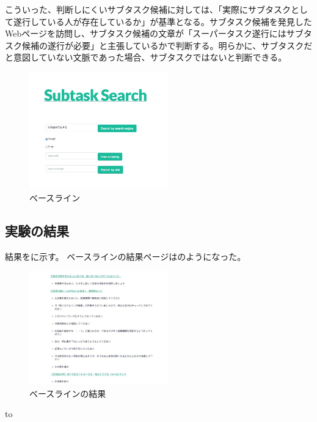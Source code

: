 \documentclass[submit,techreq]{ipsj}
\begin{document}
こういった、判断しにくいサブタスク候補に対しては、「実際にサブタスクとして遂行している人が存在しているか」が基準となる。サブタスク候補を発見したWebページを訪問し、サブタスク候補の文章が「スーパータスク遂行にはサブタスク候補の遂行が必要」と主張しているかで判断する。明らかに、サブタスクだと意図していない文脈であった場合、サブタスクではないと判断できる。


\begin{figure}[tb]
\includegraphics[width=6cm, bb=0 0 550 719]{base_line1.jpg}
\caption{ベースライン}
\label{fig:single}
\end{figure}


\subsection{実験の結果}

結果をに示す。
ベースラインの結果ページはのようになった。



\begin{figure}[tb]
\includegraphics[width=6cm, bb=0 0 550 719]{base_line3.jpg}
\caption{ベースラインの結果}
\label{fig:baseline_result}
\end{figure}




\begin{table}[tb] 
\caption{花粉症対策の方法タスク検索} 
\label{tab:result}
\hbox to
\end{table}
\end{document}
